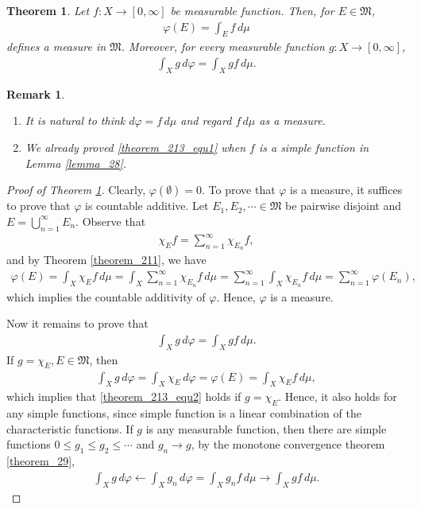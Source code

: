 \documentclass[11pt]{book}
\newtheorem{theorem}{Theorem}[chapter]
\newtheorem{remark}{Remark}[chapter]
\theoremstyle{definition}
\numberwithin{equation}{chapter}
\begin{document}
\medskip

\begin{theorem}\label{theorem_213}
Let $f: X \to [0,\infty]$ be measurable function. Then, for $E \in \mathfrak{M}$,
\begin{align}\label{theorem_213_equ1}
    \varphi(E) = \int_E f\,d\mu
\end{align}
defines a measure in $\mathfrak{M}$. Moreover, for every measurable function $g: X \to [0,\infty]$,
\begin{align}\label{theorem_213_equ2}
    \int_X g\,d\varphi = \int_X gf\, d\mu.
\end{align}
\end{theorem}

\begin{remark}
~\begin{enumerate}[label=(\alph*)]
    \item It is natural to think $d\varphi = f\,d\mu$ and regard $f\,d\mu$ as a measure.
    
    \item We already proved \eqref{theorem_213_equ1} when $f$ is a simple function in Lemma \ref{lemma_28}.
\end{enumerate}
\end{remark}

\medskip

\begin{proof}[Proof of Theorem \ref{theorem_213}]
Clearly, $\varphi(\emptyset) = 0$. To prove that $\varphi$ is a measure, it suffices to prove that $\varphi$ is countable additive. Let $E_1,E_2,\cdots \in \mathfrak{M}$ be pairwise disjoint and $E = \bigcup^\infty_{n=1} E_n$. Observe that
\begin{align*}
    \chi_E f = \sum^\infty_{n=1} \chi_{E_n}f,
\end{align*}
and by Theorem \ref{theorem_211}, we have
\begin{align*}
    \varphi(E) = \int_X \chi_Ef\,d\mu = \int_X \sum^\infty_{n=1} \chi_{E_n}f\,d\mu = \sum^\infty_{n=1} \int_X \chi_{E_n}f\,d\mu = \sum^\infty_{n=1} \varphi(E_n),
\end{align*}
which implies the countable additivity of $\varphi$. Hence, $\varphi$ is a measure.

Now it remains to prove that
\begin{align*}
    \int_X g\,d\varphi = \int_X gf\, d\mu.
\end{align*}
If $g = \chi_E, E \in \mathfrak{M}$, then
\begin{align*}
    \int_X g\,d\varphi = \int_X \chi_E\,d\varphi = \varphi(E) = \int_X \chi_Ef\,d\mu,
\end{align*}
which implies that \eqref{theorem_213_equ2} holds if $g = \chi_E$. Hence, it also holds for any simple functions, since simple function is a linear combination of the characteristic functions. If $g$ is any measurable function, then there are simple functions $0 \leq g_1 \leq g_2 \leq \cdots$ and $g_n \to g$, by the monotone convergence theorem \ref{theorem_29},
\begin{align*}
    \int_X g\,d\varphi \leftarrow \int_X g_n\,d\varphi = \int_X g_nf\,d\mu \to \int_X gf\,d\mu.
\end{align*}
\end{proof}
\end{document}
